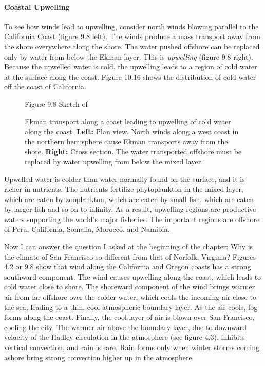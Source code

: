 \paragraph{Coastal Upwelling}
To see how winds lead to
upwelling, consider north winds blowing
parallel to the California Coast (figure 9.8 left). The winds produce
a mass transport away from the shore
everywhere along the shore. The water pushed offshore can be replaced
only by water from below the Ekman layer. This is
\textit{upwelling} (figure 9.8 right). Because
the upwelled water is cold, the upwelling leads to a region of cold
water at the surface along the coast. Figure 10.16 shows the
distribution of cold water off the coast of California.
\begin{figure}[t!]
\footnotesize
Figure 9.8 Sketch of \rule{0mm}{5ex}Ekman transport along a coast
leading to upwelling of cold water along the
coast. \textbf{Left:} Plan view. North winds along a west coast in the
northern hemisphere cause Ekman transports away from the
shore. \textbf{Right:} Cross section. The water transported offshore
must be replaced by water upwelling from below the mixed
layer.
\label{fig:upwelling}
\vspace{-3ex}
\end{figure}

Upwelled water is colder than water normally found on the surface, and
it is richer in nutrients. The nutrients fertilize phytoplankton in
the mixed layer, which are eaten
by zooplankton, which are eaten by small fish, which are eaten by
larger fish and so on to infinity. As a result,
upwelling regions are productive waters
supporting the world's major fisheries. The important regions are
offshore of Peru, California, Somalia, Morocco, and Namibia.

Now I can answer the question I asked at the beginning of the chapter:
Why is the climate of San Francisco so different from that of Norfolk,
Virginia?  Figures 4.2 or 9.8 show that wind along the California and
Oregon coasts has a strong southward component. The wind causes
upwelling along the coast, which leads to
cold water close to shore. The shoreward component of the wind brings
warmer air from far offshore over the colder water, which cools the
incoming air close to the sea, leading to a thin, cool atmospheric
boundary layer. As the air cools, fog forms along the coast. Finally,
the cool layer of air is blown over San Francisco, cooling the
city. The warmer air above the boundary layer, due to downward
velocity of the Hadley circulation in the atmosphere (see figure 4.3),
inhibits vertical convection, and rain is rare. Rain forms only when
winter storms coming ashore bring strong convection higher up in the
atmosphere.

